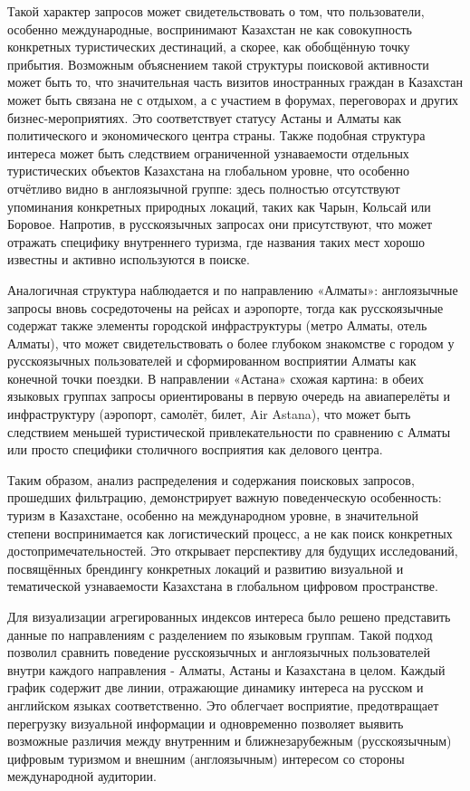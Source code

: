 Такой характер запросов может свидетельствовать о том, что пользователи,
особенно международные, воспринимают Казахстан не как совокупность
конкретных туристических дестинаций, а скорее, как обобщённую точку
прибытия. Возможным объяснением такой структуры поисковой активности
может быть то, что значительная часть визитов иностранных граждан в
Казахстан может быть связана не с отдыхом, а с участием в форумах,
переговорах и других бизнес-мероприятиях. Это соответствует статусу
Астаны и Алматы как политического и экономического центра страны. Также
подобная структура интереса может быть следствием ограниченной
узнаваемости отдельных туристических объектов Казахстана на глобальном
уровне, что особенно отчётливо видно в англоязычной группе: здесь
полностью отсутствуют упоминания конкретных природных локаций, таких как
Чарын, Кольсай или Боровое. Напротив, в русскоязычных запросах они
присутствуют, что может отражать специфику внутреннего туризма, где
названия таких мест хорошо известны и активно используются в поиске.

Аналогичная структура наблюдается и по направлению «Алматы»:
англоязычные запросы вновь сосредоточены на рейсах и аэропорте, тогда
как русскоязычные содержат также элементы городской инфраструктуры
(метро Алматы, отель Алматы), что может свидетельствовать о более
глубоком знакомстве с городом у русскоязычных пользователей и
сформированном восприятии Алматы как конечной точки поездки. В
направлении «Астана» схожая картина: в обеих языковых группах запросы
ориентированы в первую очередь на авиаперелёты и инфраструктуру
(аэропорт, самолёт, билет, Air Astana), что может быть следствием
меньшей туристической привлекательности по сравнению с Алматы или просто
специфики столичного восприятия как делового центра.

Таким образом, анализ распределения и содержания поисковых запросов,
прошедших фильтрацию, демонстрирует важную поведенческую особенность:
туризм в Казахстане, особенно на международном уровне, в значительной
степени воспринимается как логистический процесс, а не как поиск
конкретных достопримечательностей. Это открывает перспективу для будущих
исследований, посвящённых брендингу конкретных локаций и развитию
визуальной и тематической узнаваемости Казахстана в глобальном цифровом
пространстве.

Для визуализации агрегированных индексов интереса было решено
представить данные по направлениям с разделением по языковым группам.
Такой подход позволил сравнить поведение русскоязычных и англоязычных
пользователей внутри каждого направления - Алматы, Астаны и Казахстана в
целом. Каждый график содержит две линии, отражающие динамику интереса на
русском и английском языках соответственно. Это облегчает восприятие,
предотвращает перегрузку визуальной информации и одновременно позволяет
выявить возможные различия между внутренним и ближнезарубежным
(русскоязычным) цифровым туризмом и внешним (англоязычным) интересом со
стороны международной аудитории.

